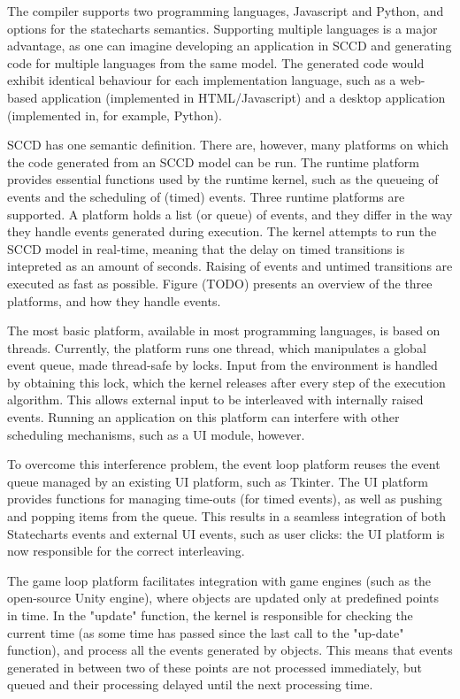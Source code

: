 The compiler supports two programming languages, Javascript and Python, and options for the statecharts semantics. Supporting 
multiple languages is a major advantage, as one can imagine developing an application in SCCD and generating code for multiple 
languages from the same model. The generated code would exhibit identical behaviour for each implementation language, such as a 
web-based application (implemented in HTML/Javascript) and a desktop application (implemented in, for example, Python).

SCCD has one semantic definition. There are, however, many platforms on which the code generated from an SCCD model can be run. 
The runtime platform provides essential functions used by the runtime kernel, such as the queueing of events and the scheduling 
of (timed) events. Three runtime platforms are supported. A platform holds a list (or queue) of events, and they differ in the 
way they handle events generated during execution. The kernel attempts to run the SCCD model in real-time, meaning that the delay 
on timed transitions is intepreted as an amount of seconds. Raising of events and untimed transitions are executed as fast as 
possible. Figure (TODO) presents an overview of the three platforms, and how they handle events.

The most basic platform, available in most programming languages, is based on threads. Currently, the platform runs one thread, 
which manipulates a global event queue, made thread-safe by locks. Input from the environment is handled by obtaining this lock, 
which the kernel releases after every step of the execution algorithm. This allows external input to be interleaved with 
internally raised events. Running an application on this platform can interfere with other scheduling mechanisms, such as a UI 
module, however.

To overcome this interference problem, the event loop platform reuses the event queue managed by an existing UI platform, such 
as Tkinter. The UI platform provides functions for managing time-outs (for timed events), as well as pushing and popping items 
from the queue. This results in a seamless integration of both Statecharts events and external UI events, such as user clicks: 
the UI platform is now responsible for the correct interleaving.

The game loop platform facilitates integration with game engines (such as the open-source Unity engine), where objects are 
updated only at predefined points in time. In the "update" function, the kernel is responsible for checking the current time 
(as some time has passed since the last call to the "up-date" function), and process all the events generated by objects. This 
means that events generated in between two of these points are not processed immediately, but queued and their processing delayed 
until the next processing time.

